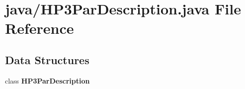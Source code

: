 \section{java/\-H\-P3\-Par\-Description.java File Reference}
\label{HP3ParDescription_8java}
\subsection*{Data Structures}
\begin{DoxyCompactItemize}
\item 
class {\bf H\-P3\-Par\-Description}
\end{DoxyCompactItemize}
